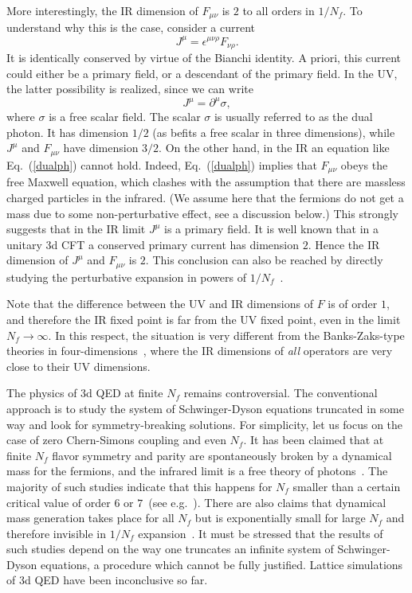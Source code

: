 \documentclass[a4paper,12pt, amsfonts, amssymb]{article}
\newcommand{\ra}{\rightarrow}
\newcommand{\eps}{\epsilon}
\begin{document}
More interestingly,
the IR dimension of $F_{\mu\nu}$ is $2$ to all orders in $1/N_f$.
To understand why this is the case, consider a current
$$
J^\mu=\eps^{\mu\nu\rho} F_{\nu\rho}.
$$
It is identically conserved by virtue of the Bianchi identity.
A priori, this current could either be a primary field, or a descendant
of the primary field. In the UV, the latter possibility is realized,
since we can write 
\begin{equation}\label{dualph}
J^\mu=\partial^\mu \sigma,
\end{equation}
where $\sigma$ is a free scalar field. The scalar $\sigma$ is usually
referred to as the dual photon. It has dimension $1/2$ (as befits a free scalar in three dimensions), while $J^\mu$ and $F_{\mu\nu}$ have dimension $3/2$. 
On the
other hand, in the IR an equation like Eq.~(\ref{dualph}) cannot hold.
Indeed, Eq.~(\ref{dualph}) implies that $F_{\mu\nu}$ obeys the free Maxwell equation, which clashes with the assumption that there are massless charged particles in the infrared. (We assume here that the fermions do not get a mass due to some non-perturbative effect, see a discussion below.) 
This strongly suggests that in the IR limit $J^\mu$ is a primary field. 
It is well known that 
in a unitary 3d CFT a conserved primary current has dimension $2$. 
Hence the IR dimension of $J^\mu$ and $F_{\mu\nu}$ is $2.$ 
This conclusion can also
be reached by directly studying the perturbative expansion in powers 
of $1/N_f$~\cite{AH}. 


Note that the difference between the UV and IR dimensions of $F$
is of order $1$, and therefore the IR fixed point is far from the UV
fixed point, even in the limit $N_f\ra\infty$. In this respect,
the situation is very different from the Banks-Zaks-type theories
in four-dimensions~\cite{BZ}, where the IR dimensions of {\it all} operators are very close to their UV dimensions.

The physics of 3d QED at finite $N_f$ remains controversial. The conventional
approach is to study the system of Schwinger-Dyson equations truncated 
in some way and look for symmetry-breaking solutions. For simplicity,
let us focus on the case of zero Chern-Simons coupling and even $N_f$.
It has been claimed that at finite $N_f$ flavor symmetry and parity are spontaneously broken by a dynamical mass for the fermions, and the infrared limit is a free theory of photons~\cite{Pisarski}. The majority of such studies indicate that this happens for $N_f$ smaller than a certain critical value of order $6$ or $7$~(see e.g.~\cite{ANW,Nash,Maris}).
There are also claims that dynamical mass 
generation takes place for all $N_f$ but is exponentially small for large
$N_f$ and therefore invisible in $1/N_f$ expansion~\cite{Pisarski,PW,CPW}.
It must be stressed that the results of such studies depend on the way one truncates an infinite system of Schwinger-Dyson equations, a procedure which 
cannot be fully justified. Lattice simulations of 3d QED have been
inconclusive so far. 
\end{document}
